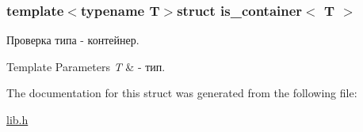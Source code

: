 \subsubsection*{template$<$typename T$>$struct is\-\_\-container$<$ T $>$}

Проверка типа -\/ контейнер. 


\begin{DoxyTemplParams}{Template Parameters}
{\em T} & -\/ тип. \\
\hline
\end{DoxyTemplParams}


The documentation for this struct was generated from the following file\-:\begin{DoxyCompactItemize}
\item 
\hyperlink{lib_8h}{lib.\-h}\end{DoxyCompactItemize}
